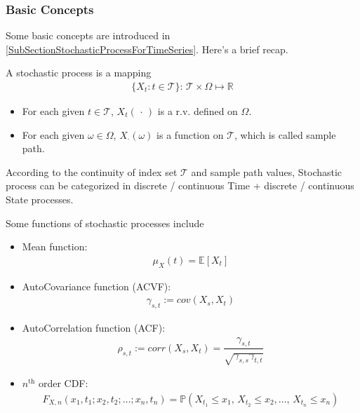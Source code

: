 \subsubsection{Basic Concepts}
Some basic concepts are introduced in \autoref{SubSectionStochasticProcessForTimeSeries}. Here's a brief recap.

A stochastic process is a mapping
\begin{align*}
     \{X_t:t\in\mathcal{T}\}:\, \mathcal{T}\times\Omega \mapsto \mathbb{R}
\end{align*}

\begin{itemize}[topsep=2pt,itemsep=0pt]
    \item For each given $ t \in\mathcal{T}$, $ X_t(\, \cdot \, ) $ is a r.v. defined on $ \Omega  $.
    \item For each given $ \omega \in \Omega  $, $ X_\cdot (\omega ) $ is a function on $ \mathcal{T} $, which is called sample path.
\end{itemize}

According to the continuity of index set $ \mathcal{T} $ and sample path values, Stochastic process can be categorized in discrete / continuous Time + discrete / continuous State processes.

Some functions of stochastic processes include
\begin{itemize}[topsep=2pt,itemsep=0pt]
    \item Mean function:
    \begin{align*}
        \mu _X(t)=\mathbb{E}\left[ X_t \right]  
    \end{align*}
    \item AutoCovariance function (ACVF):
    \begin{align*}
        \gamma _{s,t}:=cov(X_s,X_t)
    \end{align*}
    \item AutoCorrelation function (ACF):
    \begin{align*}
        \rho _{s,t}:=corr(X_s,X_t)=\dfrac{\gamma _{s,t}}{\sqrt{\gamma _{s,s}\gamma _{t,t}}} 
    \end{align*}
    \item $ n^\mathrm{th}  $ order CDF:
    \begin{align*}
        F_{X,n}(x_1,t_1;x_2,t_2;\ldots;x_n,t_n)=\mathbb{P}\left( X_{t_1}\leq x_1,\,X_{t_2}\leq x_2,\ldots,\,X_{t_n}\leq x_n \right)  
    \end{align*}
   
\end{itemize}

